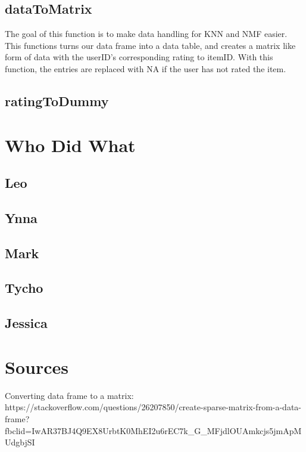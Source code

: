 \documentclass{article}
\begin{document}
\subsection{dataToMatrix}
The goal of this function is to make data handling for KNN and NMF easier. This functions turns our data frame into a data table, and creates a matrix like form of data with the userID's corresponding rating to itemID. With this function, the entries are replaced with NA if the user has not rated the item.

\subsection{ratingToDummy}



\section{Who Did What}
\subsection{Leo}

\subsection{Ynna}

\subsection{Mark}

\subsection{Tycho}

\subsection{Jessica}

\section{Sources}
Converting data frame to a matrix: https://stackoverflow.com/questions/26207850/create-sparse-matrix-from-a-data-frame?fbclid=IwAR37BJ4Q9EX8UrbtK0MhEI2u6rEC7k_G_MFjdlOUAmkcjs5jmApMUdgbjSI
\end{document}
